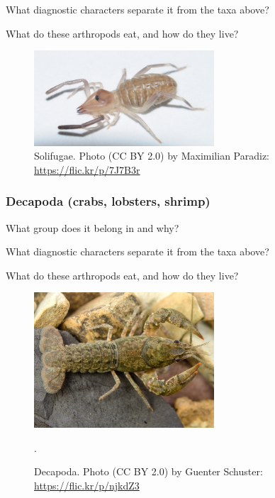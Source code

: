 \documentclass[letterpaper, 11pt]{article}
\begin{document}
\noindent{}What diagnostic characters separate it from the taxa above?\vspace{1.5cm}

\noindent{}What do these arthropods eat, and how do they live?\vspace{1.5cm}

\begin{figure}[ht!]
  \centering
    \includegraphics[width=0.6\textwidth]{solfugida}
  \caption{Solifugae. Photo (CC BY 2.0) by Maximilian Paradiz: \url{https://flic.kr/p/7J7B3r}}
  \label{fig:solfugida}
\end{figure}

\subsubsection*{Decapoda (crabs, lobsters, shrimp)}
What group does it belong in and why?\vspace{1cm}

\noindent{}What diagnostic characters separate it from the taxa above?\vspace{1.5cm}

\noindent{}What do these arthropods eat, and how do they live?\vspace{1.5cm}

\begin{figure}[ht!]
  \centering
    \includegraphics[width=0.6\textwidth]{decapod}
  \caption{Decapoda. Photo (CC BY 2.0) by Guenter Schuster: \url{https://flic.kr/p/njkdZ3}}.
  \label{fig:decapoda}
\end{figure}
\end{document}
